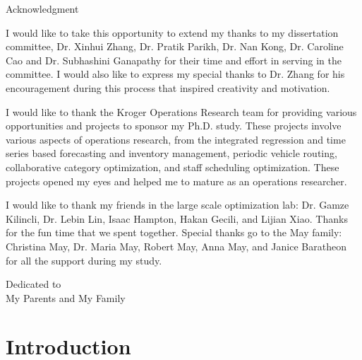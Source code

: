\documentclass[12pt,english]{report}
\begin{document}
\begin{doublespace}
    \tableofcontents
    \listoffigures
    \listoftables
\end{doublespace}
%
\newpage
\thispagestyle{plain}
\setlength{\parindent}{0em}
\begin{center}
    {\huge Acknowledgment}
\end{center}

\setlength{\parindent}{2em}

I would like to take this opportunity to extend my thanks to my dissertation committee,  Dr. Xinhui Zhang, Dr. Pratik Parikh, Dr. Nan Kong, Dr. Caroline Cao and Dr. Subhashini Ganapathy for their time and effort in serving in the committee.  I would also like to express my special thanks to Dr. Zhang for his encouragement during this process that inspired creativity and motivation.

I would like to thank the Kroger Operations Research team for providing various opportunities and projects to sponsor my Ph.D. study.  These projects involve various aspects of operations research, from the integrated regression and time series based forecasting and inventory management, periodic vehicle routing, collaborative category optimization, and staff scheduling optimization.  These projects opened my eyes and helped me to mature as an operations researcher.

I would like to thank my friends in the large scale optimization lab: Dr. Gamze Kilincli, Dr. Lebin Lin, Isaac Hampton, Hakan Gecili, and Lijian Xiao. Thanks for the fun time that we spent together.
Special thanks go to the May family: Christina May, Dr. Maria May, Robert May, Anna May, and Janice Baratheon for all the support during my study.

%
\newpage
\thispagestyle{plain}
\vspace*{3in}
\begin{center}
    Dedicated to\\
    My Parents and My Family
\end{center}


\newpage
\setcounter{page}{1}
\setlength{\parindent}{2em}
\chapter{Introduction}
\end{document}
